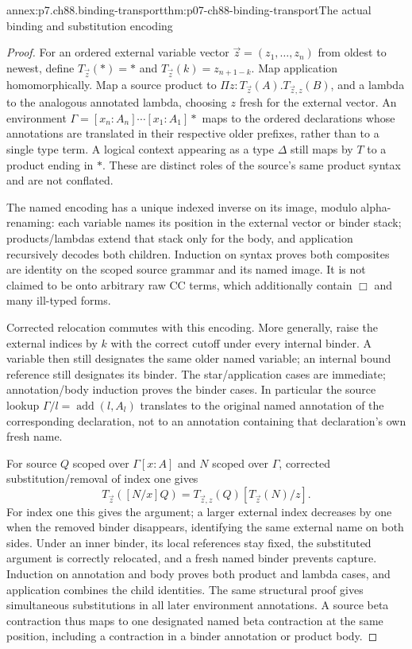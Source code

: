 \begin{annexitem}{annex:p7.ch88.binding-transport}{thm:p07-ch88-binding-transport}{The actual binding and substitution encoding}
\begin{proof}
For an ordered external variable vector \(\vec z=(z_1,\ldots,z_n)\)
from oldest to newest, define \(T_{\vec z}(\ast)=\ast\) and
\(T_{\vec z}(k)=z_{n+1-k}\). Map application homomorphically.
Map a source product to \(\Pi z:T_{\vec z}(A).
T_{\vec z,z}(B)\), and a lambda to the analogous annotated lambda,
choosing \(z\) fresh for the external vector. An environment
\(\Gamma=[x_n:A_n]\cdots[x_1:A_1]\ast\) maps to the ordered
declarations whose annotations are translated in their respective
older prefixes, rather than to a single type term. A logical context
appearing as a type \(\Delta\) still maps by \(T\) to a product
ending in \(\ast\). These are distinct roles of the source's
same product syntax and are not conflated.

The named encoding has a unique indexed inverse on its image, modulo
alpha-renaming: each variable names its position in the external vector
or binder stack; products/lambdas extend that stack only for the body,
and application recursively decodes both children. Induction on syntax
proves both composites are identity on the scoped source grammar and
its named image. It is not claimed to be onto arbitrary raw CC terms,
which additionally contain \(\Box\) and many ill-typed forms.

Corrected relocation commutes with this encoding. More generally, raise
the external indices by \(k\) with the correct cutoff under every
internal binder. A variable then still designates the same older named
variable; an internal bound reference still designates its binder.
The star/application cases are immediate; annotation/body induction
proves the binder cases. In particular the source lookup
\(\Gamma/l=\operatorname{add}(l,A_l)\) translates to the
original named annotation of the corresponding declaration, not to
an annotation containing that declaration's own fresh name.

For source \(Q\) scoped over \(\Gamma[x:A]\) and \(N\) scoped
over \(\Gamma\), corrected substitution/removal of index one gives
\[
 T_{\vec z}([N/x]Q)
   =T_{\vec z,z}(Q)[T_{\vec z}(N)/z].
\]
For index one this gives the argument; a larger external index decreases
by one when the removed binder disappears, identifying the same external
name on both sides. Under an inner binder, its local references stay
fixed, the substituted argument is correctly relocated, and a fresh
named binder prevents capture. Induction on annotation and body proves
both product and lambda cases, and application combines the child
identities. The same structural proof gives simultaneous substitutions
in all later environment annotations. A source beta contraction thus
maps to one designated named beta contraction at the same position,
including a contraction in a binder annotation or product body.
\end{proof}
\end{annexitem}

